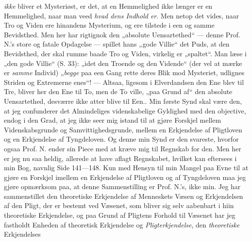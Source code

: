 \documentclass[12pt,a4paper]{book}
\newcommand{\opage}[1]{\marginnote{\footnotesize\textit{[#1]}}}
\begin{document}
{  \emph{ikke} bliver et Mysteriøst, er det, at en Hemmelighed ikke længer er en
  Hemmelighed, naar man veed \emph{hvad dens Indhold er}. Men netop det vides,
  naar Tro og Viden ere hinandens Mysterium, og ere tilstede i een og samme
  Bevidsthed. Men her har rigtignok den „absolute Uensartethed“ --- denne Prof.
  N.'s store og fatale Opdagelse --- spillet hans „gode Villie“ det Puds, at den
  Bevidsthed, der skal rumme baade Tro og Viden, virkelig er „spaltet“. Man læse
  i „den gode Villie“ (S. 33): „idet den Troende og den Vidende“ (der vel at
  mærke er \emph{samme} Individ) „\emph{begge} paa een Gang rette deres Blik mod
  Mysteriet, udlignes Striden og Extremerne enes“! --- Altsaa, ligesom i
  Elverdandsen den Ene blev til Tre, bliver her den Ene til To, men de To ville,
  „paa Grund af“ den absolute Uensartethed, desværre ikke atter blive til
  Een.}.
\opage{11} %
Min første Synd skal være den, at jeg confunderer det Almindeliges videnskabelige
Gyldighed med den objective, endog i den Grad, at jeg ikke seer mig istand til
at gjøre Forskjel mellem Videnskabsgrunde og Samvittighedsgrunde, mellem en
Erkjendelse af Pligtloven og en Erkjendelse af Tyngdeloven. Og denne min Synd er
den svareste, hvorfor ogsaa Prof. N. ender sin Piece med at kræve mig til
Regnskab for den. Men her er jeg nu saa heldig, allerede at have aflagt
Regnskabet, hvilket kan eftersees i min Bog, navnlig Side 141---148. Kun med
Hensyn til min Mangel paa Evne til at gjøre en Forskjel imellem en Erkjendelse
af Pligtloven og af Tyngdeloven maa jeg gjøre opmærksom paa, at denne
Sammenstilling er Prof. N.'s, ikke min. Jeg har sammenstillet den theoretiske
Erkjendelse af Menneskets Væsen og Erkjendelsen af den Pligt, der er bestemt ved
Væsenet, som bliver sig selv aabenbart i hiin theoretiske Erkjendelse, og paa
Grund af Pligtens Forhold til Væsenet har jeg fastholdt Enheden af theoretisk
Erkjendelse og \emph{Pligterkjendelse}, den \emph{theoretiske} Erkjendelses
\end{document}
